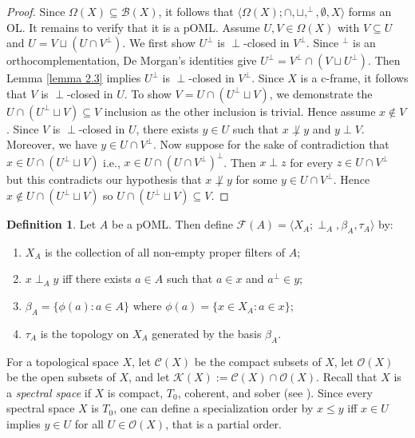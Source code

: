 \documentclass{amsart}
\theoremstyle{plain}
\theoremstyle{definition}
\newtheorem{definition}[theorem]{Definition}
\begin{document}
    \begin{proof}
Since $\Omega(X)\subseteq\mathcal{B}(X)$, it follows that $\langle\Omega(X);\cap,\sqcup,^{\perp},\emptyset,X\rangle$ forms an OL. It remains to verify that it is a pOML. Assume $U,V\in\Omega(X)$ with $V\subseteq U$ and $U=V\sqcup(U\cap V^{\perp})$. We first show $U^{\perp}$ is $\perp$-closed in $V^{\perp}$. Since $^{\perp}$ is an orthocomplementation, De Morgan's identities give $U^{\perp}=V^{\perp}\cap(V\sqcup U^{\perp})$. Then Lemma \ref{lemma 2.3} implies $U^{\perp}$ is $\perp$-closed in $V^{\perp}$. Since $X$ is a c-frame, it follows that $V$ is $\perp$-closed in $U$. To show $V=U\cap(U^{\perp}\sqcup V)$, we demonstrate the $U\cap(U^{\perp}\sqcup V)\subseteq V$ inclusion as the other inclusion is trivial. Hence assume $x\not\in V$. Since $V$ is $\perp$-closed in $U$, there exists $y\in U$ such that $x\not\perp y$ and $y\perp V$. Moreover, we have $y\in U\cap V^{\perp}$. Now suppose for the sake of contradiction that $x\in U\cap(U^{\perp}\sqcup V)$ i.e., $x\in U\cap(U\cap V^{\perp})^{\perp}$. Then $x\perp z$ for every $z\in U\cap V^{\perp}$ but this contradicts our hypothesis that $x\not\perp y$ for some $y\in U\cap V^{\perp}$. Hence $x\not\in U\cap(U^{\perp}\sqcup V)$ so $U\cap(U^{\perp}\sqcup V)\subseteq V$.  
\end{proof} 
\begin{definition}
    Let $A$ be a pOML. Then define $\mathcal{F}(A)=\langle X_A;\perp_A,\beta_A,\tau_A\rangle$ by: 
    \begin{enumerate}
        \item $X_A$ is the collection of all non-empty proper filters of $A$; 
        \item $x\perp_A y$ iff there exists $a\in A$ such that $a\in x$ and $a^{\perp}\in y$; 
        \item $\beta_A=\{\phi(a):a\in A\}$ where $\phi(a)=\{x\in X_A:a\in x\}$; 
        \item $\tau_A$ is the topology on $X_A$ generated by the basis $\beta_A$. 
    \end{enumerate}
\end{definition}
For a topological space $X$, let $\mathcal{C}(X)$ be the compact subsets of $X$, let $\mathcal{O}(X)$ be the open subsets of $X$, and let $\mathcal{K}(X):=\mathcal{C}(X)\cap\mathcal{O}(X)$. Recall that $X$ is a \emph{spectral space} if $X$ is compact, $T_0$, coherent, and sober (see \cite[Section 3.2]{mcdonald}). Since every spectral space $X$ is $T_0$, one can define a specialization order by $x\leqslant y$ iff $x\in U$ implies $y\in U$ for all $U\in\mathcal{O}(X)$, that is a partial order.  
\end{document}
